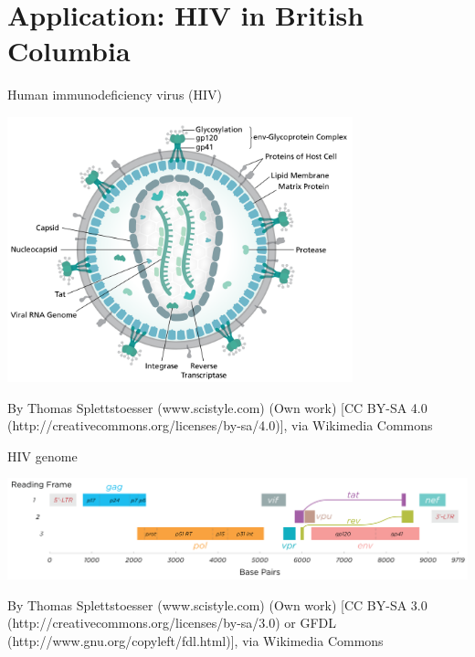 \documentclass{beamer}
\begin{document}
\section{Application: HIV in British Columbia}

\begin{frame}{Human immunodeficiency virus (HIV)}
    \vspace{-0.5cm}
    \begin{center}
    \includegraphics[width=0.75\textwidth]{hiv-structure}
    \end{center}
    \tiny
    By Thomas Splettstoesser (www.scistyle.com) (Own work) [CC BY-SA 4.0
    (http://creativecommons.org/licenses/by-sa/4.0)], via Wikimedia Commons \par
\end{frame}

\begin{frame}{HIV genome}
    \vspace{1cm}

    \includegraphics[width=\textwidth]{hiv-genome}

    \vspace{2cm}
    \tiny
    By Thomas Splettstoesser (www.scistyle.com) (Own work) [CC BY-SA 3.0
    (http://creativecommons.org/licenses/by-sa/3.0) or GFDL
    (http://www.gnu.org/copyleft/fdl.html)], via Wikimedia Commons\par
\end{frame}
\end{document}
